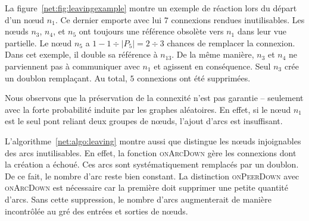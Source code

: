 \begin{figure*}
  \centering
  \hspace{40pt}
  \hspace{40pt}
  \caption[Gestion des départs et défaillances dans
  \SPRAY]{\label{net:fig:leavingexample}Exemple de gestion de départs et
    défaillances dans \SPRAY.}
\end{figure*}

La figure~\ref{net:fig:leavingexample} montre un exemple de réaction lors du
départ d'un nœud $n_1$. Ce dernier emporte avec lui $7$ connexions rendues
inutilisables. Les nœuds $n_3$, $n_4$, et $n_5$ ont toujours une référence
obsolète vers $n_1$ dans leur vue partielle. Le nœud $n_5$ a
$1-{1\div{|P_5|}}={2\div{3}}$ chances de remplacer la connexion. Dans cet
exemple, il double sa référence à $n_{13}$. De la même manière, $n_3$ et $n_4$
ne parviennent pas à communiquer avec $n_1$ et agissent en conséquence. Seul
$n_3$ crée un doublon remplaçant. Au total, $5$ connexions ont été supprimées.

Nous observons que la préservation de la connexité n'est pas garantie --
seulement avec la forte probabilité induite par les graphes aléatoires. En
effet, si le nœud $n_1$ est le seul pont reliant deux groupes de nœuds, l'ajout
d'arcs est insuffisant.

L'algorithme~\ref{net:algo:leaving} montre aussi que \SPRAY distingue les nœuds
injoignables des arcs inutilisables. En effet, la fonction \textsc{onArcDown}
gère les connexions dont la création a échoué. Ces arcs sont systématiquement
remplacés par un doublon. De ce fait, le nombre d'arc reste bien constant. La
distinction \textsc{onPeerDown} avec \textsc{onArcDown} est nécessaire car la
première doit supprimer une petite quantité d'arcs. Sans cette suppression, le
nombre d'arcs augmenterait de manière incontrôlée au gré des entrées et sorties
de nœuds.


